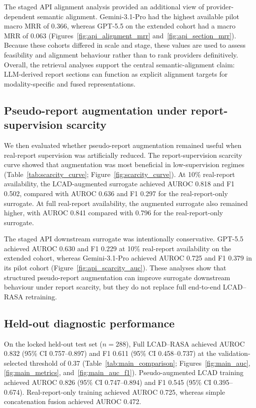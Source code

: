 The staged API alignment analysis provided an additional view of provider-dependent semantic alignment. Gemini-3.1-Pro had the highest available pilot macro MRR of 0.366, whereas GPT-5.5 on the extended cohort had a macro MRR of 0.063 (Figures~\ref{fig:api_alignment_mrr} and~\ref{fig:api_section_mrr}). Because these cohorts differed in scale and stage, these values are used to assess feasibility and alignment behaviour rather than to rank providers definitively. Overall, the retrieval analyses support the central semantic-alignment claim: LLM-derived report sections can function as explicit alignment targets for modality-specific and fused representations.

\subsection{Pseudo-report augmentation under report-supervision scarcity}
\label{subsec:scarcity_results}

We then evaluated whether pseudo-report augmentation remained useful when real-report supervision was artificially reduced. The report-supervision scarcity curve showed that augmentation was most beneficial in low-supervision regimes (Table~\ref{tab:scarcity_curve}; Figure~\ref{fig:scarcity_curve}). At 10\% real-report availability, the LCAD-augmented surrogate achieved AUROC 0.818 and F1 0.502, compared with AUROC 0.636 and F1 0.297 for the real-report-only surrogate. At full real-report availability, the augmented surrogate also remained higher, with AUROC 0.841 compared with 0.796 for the real-report-only surrogate.

The staged API downstream surrogate was intentionally conservative. GPT-5.5 achieved AUROC 0.630 and F1 0.229 at 10\% real-report availability on the extended cohort, whereas Gemini-3.1-Pro achieved AUROC 0.725 and F1 0.379 in its pilot cohort (Figure~\ref{fig:api_scarcity_auc}). These analyses show that structured pseudo-report augmentation can improve surrogate downstream behaviour under report scarcity, but they do not replace full end-to-end LCAD--RASA retraining.

\subsection{Held-out diagnostic performance}
\label{subsec:diagnostic_results}

On the locked held-out test set ($n=288$), Full LCAD--RASA achieved AUROC 0.832 (95\% CI 0.757--0.897) and F1 0.611 (95\% CI 0.458--0.737) at the validation-selected threshold of 0.37 (Table~\ref{tab:main_comparison}; Figures~\ref{fig:main_auc}, \ref{fig:main_metrics}, and~\ref{fig:main_auc_f1}). Pseudo-augmented LCAD training achieved AUROC 0.826 (95\% CI 0.747--0.894) and F1 0.545 (95\% CI 0.395--0.674). Real-report-only training achieved AUROC 0.725, whereas simple concatenation fusion achieved AUROC 0.472.

